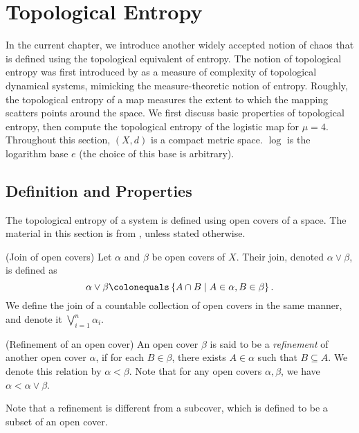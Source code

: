 \documentclass[10pt,twoside,draft]{book}
\begin{document}
\chapter{Topological Entropy}
\label{chap:entropy}
In the current chapter, we introduce another widely accepted notion of chaos that is defined using the topological equivalent of entropy.
The notion of topological entropy was first introduced by \citet{akm} as a measure of complexity of topological dynamical systems, mimicking the measure-theoretic notion of entropy.
Roughly, the topological entropy of a map measures the extent to which the mapping scatters points around the space.
We first discuss basic properties of topological entropy, then compute the topological entropy of the logistic map for $\mu = 4$.
Throughout this section, $(X,d)$ is a compact metric space.
$\log$ is the logarithm base $e$ (the choice of this base is arbitrary).

\section{Definition and Properties}
The topological entropy of a system is defined using open covers of a space. 
The material in this section is from \citep{akm}, unless stated otherwise.
\begin{definition}
  (Join of open covers)
  Let $\alpha$ and $\beta$ be open covers of $X$.
  Their join, denoted $\alpha \vee \beta$, is defined as
  \begin{equation*}
    \alpha \vee \beta \ceq \setst{A \cap B}{A \in \alpha, B \in \beta}.
  \end{equation*}
  We define the join of a countable collection of open covers in the same manner, and denote it $\bigvee\limits_{i = 1}^{n} \alpha_i$.
\end{definition}
\begin{definition}
  (Refinement of an open cover)
  An open cover $\beta$ is said to be a \textit{refinement} of another open cover $\alpha$, if for each $B \in \beta$, there exists $A \in \alpha$ such that $B \subseteq A$.
  We denote this relation by $\alpha < \beta$.
  Note that for any open covers $\alpha, \beta$, we have $\alpha < \alpha \vee \beta$.
\end{definition}
Note that a refinement is different from a subcover, which is defined to be a subset of an open cover.
\end{document}
